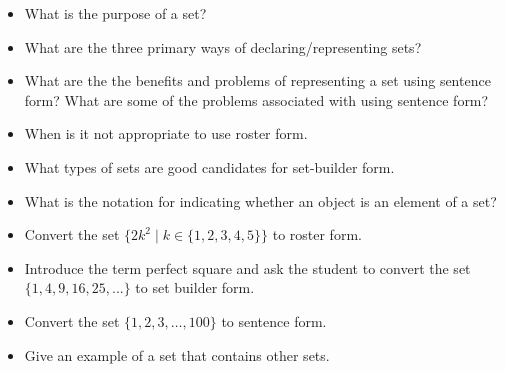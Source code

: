 \begin{itemize}
    \item What is the purpose of a set?
    \item What are the three primary ways of declaring/representing sets?
    \item What are the the benefits and problems of representing a set using sentence form?  What are some of the problems associated with using sentence form?
    \item When is it not appropriate to use roster form.
    \item What types of sets are good candidates for set-builder form.
    \item What is the notation for indicating whether an object is an element of a set?
    \item Convert the set $\{2k^2 \mid k \in \{1,2,3,4,5\}\}$ to roster form.
    \item Introduce the term perfect square and ask the student to convert the set $\{1,4,9,16,25,...\}$ to set builder form.
    \item Convert the set $\{1,2,3,\ldots,100\}$ to sentence form.
    \item Give an example of a set that contains other sets.
\end{itemize}